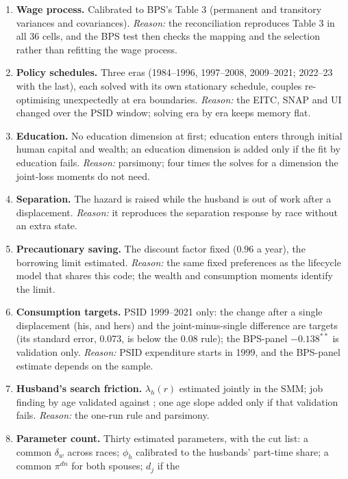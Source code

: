 \documentclass[11pt]{article}
\newcommand{\1}{\mathbf{1}}
\begin{document}
\begin{enumerate}[label=\textbf{D\arabic*.}, ref=D\arabic*, leftmargin=*]
  \item \label{od:wageproc} \textbf{Wage process.} Calibrated to BPS's Table 3 (permanent and transitory variances and
  covariances). \emph{Reason:} the reconciliation reproduces Table 3 in all 36 cells, and the BPS test then checks the
  mapping and the selection rather than refitting the wage process.
  \item \label{od:eras} \textbf{Policy schedules.} Three eras (1984--1996, 1997--2008, 2009--2021; 2022--23 with the
  last), each solved with its own stationary schedule, couples re-optimising unexpectedly at era boundaries.
  \emph{Reason:} the EITC, SNAP and UI changed over the PSID window; solving era by era keeps memory flat.
  \item \label{od:educ} \textbf{Education.} No education dimension at first; education enters through initial human
  capital and wealth; an education dimension is added only if the fit by education fails. \emph{Reason:} parsimony;
  four times the solves for a dimension the joint-loss moments do not need.
  \item \label{od:sep} \textbf{Separation.} The hazard is raised while the husband is out of work after a displacement.
  \emph{Reason:} it reproduces the separation response by race without an extra state.
  \item \label{od:credit} \textbf{Precautionary saving.} The discount factor fixed ($0.96$ a year), the borrowing limit
  estimated. \emph{Reason:} the same fixed preferences as the lifecycle model that shares this code; the wealth and
  consumption moments identify the limit.
  \item \label{od:cons} \textbf{Consumption targets.} PSID 1999--2021 only: the change after a single displacement (his,
  and hers) and the joint-minus-single difference are targets (its standard error, 0.073, is below the 0.08 rule); the
  BPS-panel $-0.138^{**}$ is validation only. \emph{Reason:} PSID expenditure starts in 1999, and the BPS-panel estimate
  depends on the sample.
  \item \label{od:husband} \textbf{Husband's search friction.} $\lambda_h(r)$ estimated jointly in the SMM; job finding by
  age validated against \citet{bacher2025joint}; one age slope added only if that validation fails. \emph{Reason:} the
  one-run rule and parsimony.
  \item \label{od:count} \textbf{Parameter count.} Thirty estimated parameters, with the cut list: a common $\delta_w$
  across races; $\phi_h$ calibrated to the husbands' part-time share; a common $\pi^{dn}$ for both spouses; $d_j$ if the

\end{enumerate}
\end{document}
